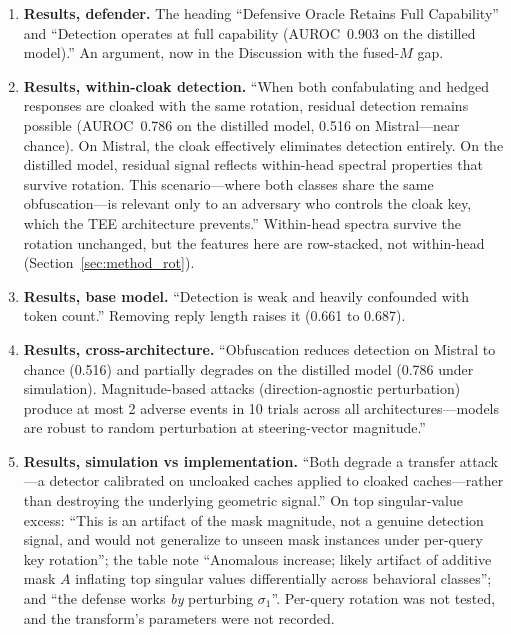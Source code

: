 \documentclass[11pt,a4paper]{article}
\begin{document}
\begin{enumerate}
\item \textbf{Results, defender.} The heading ``Defensive Oracle Retains
Full Capability'' and ``Detection operates at full capability (AUROC~0.903
on the distilled model).'' An argument, now in the Discussion with the
fused-$M$ gap.

\item \textbf{Results, within-cloak detection.} ``When both confabulating
and hedged responses are cloaked with the same rotation, residual
detection remains possible (AUROC~0.786 on the distilled model, 0.516 on
Mistral---near chance). On Mistral, the cloak effectively eliminates
detection entirely. On the distilled model, residual signal reflects
within-head spectral properties that survive rotation. This
scenario---where both classes share the same obfuscation---is relevant
only to an adversary who controls the cloak key, which the TEE
architecture prevents.'' Within-head spectra survive the rotation
unchanged, but the features here are row-stacked, not within-head
(Section~\ref{sec:method_rot}).

\item \textbf{Results, base model.} ``Detection is weak and heavily
confounded with token count.'' Removing reply length raises it (0.661 to
0.687).

\item \textbf{Results, cross-architecture.} ``Obfuscation reduces
detection on Mistral to chance (0.516) and partially degrades on the
distilled model (0.786 under simulation). Magnitude-based attacks
(direction-agnostic perturbation) produce at most 2 adverse events in 10
trials across all architectures---models are robust to random
perturbation at steering-vector magnitude.''

\item \textbf{Results, simulation vs implementation.} ``Both degrade a
transfer attack---a detector calibrated on uncloaked caches applied to
cloaked caches---rather than destroying the underlying geometric
signal.'' On top singular-value excess: ``This is an artifact of the mask
magnitude, not a genuine detection signal, and would not generalize to
unseen mask instances under per-query key rotation''; the table note
``Anomalous increase; likely artifact of additive mask $A$ inflating top
singular values differentially across behavioral classes''; and ``the
defense works \emph{by} perturbing $\sigma_1$''. Per-query rotation was
not tested, and the transform's parameters were not recorded.


\end{enumerate}
\end{document}
